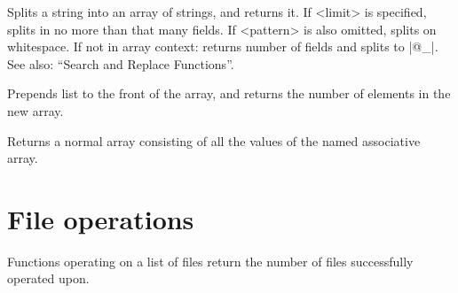 \begin{enum}{1cm}
Splits a string into an array of strings, and returns it. If <limit>
is specified, splits in no more than that many fields. If <pattern> is
also omitted, splits on whitespace. If
not in array context: returns number of fields and splits to |@_|.
See also: ``Search and Replace Functions''. 

Prepends list to the front of the array, and returns the number of
elements in the new array.

Returns a normal array consisting of all the values of the named
associative array. 

\end{enum}


\section{File operations} 

Functions operating on a list of files return the number of files
successfully operated upon.

